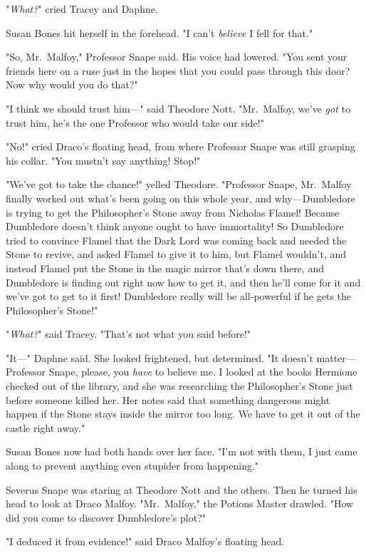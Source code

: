 "\emph{What?}" cried Tracey and Daphne.

Susan Bones hit herself in the forehead. "I can't \emph{believe} I fell for
that."

"So, Mr.~Malfoy," Professor Snape said. His voice had lowered. "You sent your
friends here on a ruse{\el} just in the hopes that you could pass through
this door? Now why would you do that?"

"I think we should trust him—" said Theodore Nott. "Mr.~Malfoy, we've
\emph{got} to trust him, he's the one Professor who would take our side!"

"No!" cried Draco's floating head, from where Professor Snape was still
grasping his collar. "You mustn't say anything! Stop!"

"We've got to take the chance!" yelled Theodore. "Professor Snape, Mr.~Malfoy
finally worked out what's been going on this whole year, and why—Dumbledore
is trying to get the Philosopher's Stone away from Nicholas Flamel! Because
Dumbledore doesn't think anyone ought to have immortality! So Dumbledore tried
to convince Flamel that the Dark Lord was coming back and needed the Stone to
revive, and asked Flamel to give it to him, but Flamel wouldn't, and instead
Flamel put the Stone in the magic mirror that's down there, and Dumbledore is
finding out right now how to get it, and then he'll come for it and we've got
to get to it first! Dumbledore really will be all-powerful if he gets the
Philosopher's Stone!"

"\emph{What?}" said Tracey. "That's not what you said before!"

"It—" Daphne said. She looked frightened, but determined. "It doesn't
matter—Professor Snape, please, you \emph{have} to believe me. I looked at
the books Hermione checked out of the library, and she was researching the
Philosopher's Stone just before someone killed her. Her notes said that
something dangerous might happen if the Stone stays inside the mirror too long.
We have to get it out of the castle right away."

Susan Bones now had both hands over her face. "I'm not with them, I just came
along to prevent anything even stupider from happening."

Severus Snape was staring at Theodore Nott and the others. Then he turned his
head to look at Draco Malfoy. "Mr.~Malfoy," the Potions Master drawled. "How
did you come to discover Dumbledore's plot?"

"I deduced it from evidence!" said Draco Malfoy's floating head.

